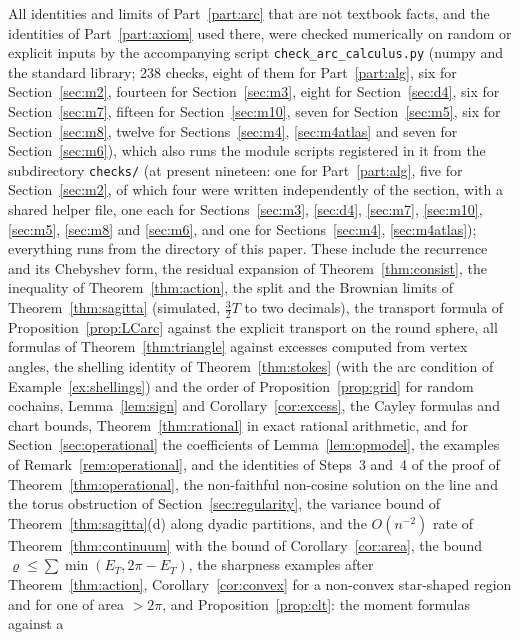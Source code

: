 \documentclass[11pt,reqno]{amsart}
\theoremstyle{definition}
\theoremstyle{remark}
\numberwithin{equation}{section}
\begin{document}
All identities and limits of Part~\ref{part:arc} that are not textbook facts, and the identities of Part~\ref{part:axiom} used there, were
checked numerically on random or explicit inputs by the accompanying script \texttt{check\_arc\_calculus.py} (numpy and the
standard library; 238 checks, eight of them for Part~\ref{part:alg}, six for Section~\ref{sec:m2}, fourteen for Section~\ref{sec:m3}, eight for Section~\ref{sec:d4}, six for Section~\ref{sec:m7}, fifteen for Section~\ref{sec:m10}, seven for Section~\ref{sec:m5}, six for Section~\ref{sec:m8}, twelve for Sections~\ref{sec:m4}, \ref{sec:m4atlas} and seven for Section~\ref{sec:m6}), which also runs the module scripts registered in it from the subdirectory \texttt{checks/} (at present nineteen: one for Part~\ref{part:alg}, five for Section~\ref{sec:m2}, of which four were written independently of the section, with a shared helper file, one each for Sections~\ref{sec:m3}, \ref{sec:d4}, \ref{sec:m7}, \ref{sec:m10}, \ref{sec:m5}, \ref{sec:m8} and \ref{sec:m6}, and one for Sections~\ref{sec:m4}, \ref{sec:m4atlas}); everything runs
from the directory of this paper.  These include the recurrence and its Chebyshev form, the residual expansion of
Theorem~\ref{thm:consist}, the inequality of Theorem~\ref{thm:action}, the split and the Brownian limits of
Theorem~\ref{thm:sagitta} (simulated, $\tfrac32T$ to two decimals), the transport formula of
Proposition~\ref{prop:LCarc} against the explicit transport on the round sphere, all formulas of
Theorem~\ref{thm:triangle} against excesses computed from vertex angles, the shelling identity of
Theorem~\ref{thm:stokes} (with the arc condition of Example~\ref{ex:shellings}) and the order of
Proposition~\ref{prop:grid} for random cochains, Lemma~\ref{lem:sign} and Corollary~\ref{cor:excess}, the Cayley formulas
and chart bounds, Theorem~\ref{thm:rational} in exact rational arithmetic, and for Section~\ref{sec:operational} the
coefficients of Lemma~\ref{lem:opmodel}, the examples of Remark~\ref{rem:operational}, and the identities of Steps~3
and~4 of the proof of Theorem~\ref{thm:operational}, the non-faithful non-cosine solution on the line and the torus
obstruction of Section~\ref{sec:regularity}, the variance bound of Theorem~\ref{thm:sagitta}(d) along dyadic partitions, and
the $O(n^{-2})$ rate of Theorem~\ref{thm:continuum} with the bound of Corollary~\ref{cor:area}, the bound
$\varrho\le\sum\min(E_T,2\pi-E_T)$, the sharpness examples after Theorem~\ref{thm:action}, Corollary~\ref{cor:convex} for a
non-convex star-shaped region and for one of area $>2\pi$, and Proposition~\ref{prop:clt}: the moment formulas against a
\end{document}
